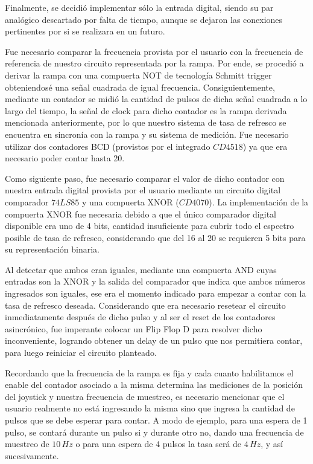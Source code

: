 Finalmente, se decidió implementar sólo la entrada digital, siendo su par analógico descartado por falta de tiempo, aunque se dejaron las conexiones pertinentes por si se realizara en un futuro.\par 

Fue necesario comparar la frecuencia provista por el usuario con la frecuencia de referencia de nuestro circuito representada por la rampa. Por ende, se procedió a derivar la rampa con una compuerta NOT de tecnología Schmitt trigger obteniendosé una señal cuadrada de igual frecuencia. Consiguientemente, mediante un contador se midió la cantidad de pulsos de dicha señal cuadrada a lo largo del tiempo, la señal de clock para dicho contador es la rampa derivada mencionada anteriormente, por lo que nuestro sistema de tasa de refresco se encuentra en sincronía con la rampa y su sistema de medición. Fue necesario utilizar dos contadores BCD (provistos por el integrado $CD4518$) ya que era necesario poder contar hasta 20.  \par 

Como siguiente paso, fue necesario comparar el valor de dicho contador con nuestra entrada digital provista por el usuario mediante un circuito digital comparador $74LS85$ y una compuerta XNOR ($CD4070$). La implementación de la compuerta XNOR fue necesaria debido a que el único comparador digital disponible era uno de 4 bits, cantidad insuficiente para cubrir todo el espectro posible de tasa de refresco, considerando que del 16 al 20 se requieren 5 bits para su representación binaria. \par 

Al detectar que ambos eran iguales, mediante una compuerta AND cuyas entradas son la XNOR y la salida del comparador que indica que ambos números ingresados son iguales, ese era el momento indicado para empezar a contar con la tasa de refresco deseada. Considerando que era necesario resetear el circuito inmediatamente después de dicho pulso y al ser el reset de los contadores asincrónico, fue imperante colocar un Flip Flop D para resolver dicho inconveniente, logrando obtener un delay de un pulso que nos permitiera contar, para luego reiniciar el circuito planteado. \par

Recordando que la frecuencia de la rampa es fija y cada cuanto habilitamos el enable del contador asociado a la misma determina las mediciones de la posición del joystick y  nuestra frecuencia de muestreo, es necesario mencionar que el usuario realmente no está ingresando la misma sino que ingresa la cantidad de pulsos que se debe esperar para contar. A modo de ejemplo, para una espera de 1 pulso, se contará durante un pulso si y durante otro no, dando una frecuencia de muestreo de $10\,Hz$ o para una espera de 4 pulsos la tasa será de $4\,Hz$, y así sucesivamente. \par
 
